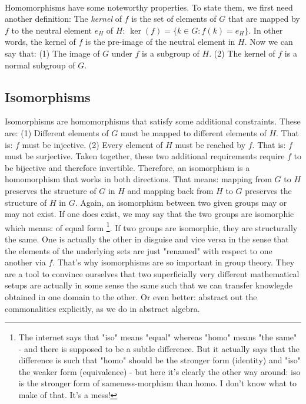 
\paragraph{} Homomorphisms have some noteworthy properties. To state them, we first need another definition: The \emph{kernel} of $f$ is the set of elements of $G$ that are mapped by $f$ to the neutral element $e_H$ of $H$: $\ker(f) = \{ k \in G: f(k) = e_H \}$. In other words, the kernel of $f$ is the pre-image of the neutral element in $H$. Now we can say that: (1) The image of $G$ under $f$ is a subgroup of $H$. (2)  The kernel of $f$ is a normal subgroup of $G$.


\subsection{Isomorphisms}
Isomorphisms are homomorphisms that satisfy some additional constraints. These are: (1) Different elements of $G$ must be mapped to different elements of $H$. That is: $f$ must be injective. (2) Every element of $H$ must be reached by $f$. That is: $f$ must be surjective. Taken together, these two additional requirements require $f$ to be bijective and therefore invertible. Therefore, an isomorphism is a homomorphism that works in both directions. That means: mapping from $G$ to $H$ preserves the structure of $G$ in $H$ and mapping back from $H$ to $G$ preserves the structure of $H$ in $G$. Again, an isomorphism between two given groups may or may not exist. If one does exist, we may say that the two groups are isomorphic which means: of equal form \footnote{The internet says that "iso" means "equal" whereas "homo" means "the same" - and there is supposed to be a subtle difference. But it actually says that the difference is such that "homo" should be the stronger form (identity) and "iso" the weaker form (equivalence) - but here it's clearly the other way around: iso is the stronger form of sameness-morphism than homo. I don't know what to make of that. It's a mess!}. If two groups are isomorphic, they are structurally the same. One is actually the other in disguise and vice versa in the sense that the elements of the underlying sets are just "renamed" with respect to one another via $f$. 
That's why isomorphisms are so important in group theory. They are a tool to convince ourselves that two superficially very different mathematical setups are actually in some sense the same such that we can transfer knowlegde obtained in one domain to the other. Or even better: abstract out the commonalities explicitly, as we do in abstract algebra.

